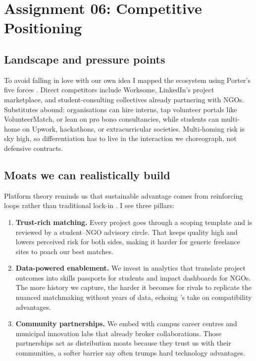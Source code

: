 \section*{Assignment 06: Competitive Positioning}

\subsection*{Landscape and pressure points}
To avoid falling in love with our own idea I mapped the ecosystem using Porter’s five forces \citep{Porter2008}. Direct competitors include Worksome, LinkedIn’s project marketplace, and student-consulting collectives already partnering with NGOs. Substitutes abound: organisations can hire interns, tap volunteer portals like VolunteerMatch, or lean on pro bono consultancies, while students can multi-home on Upwork, hackathons, or extracurricular societies. Multi-homing risk is sky high, so differentiation has to live in the interaction we choreograph, not defensive contracts.

\subsection*{Moats we can realistically build}
Platform theory reminds us that sustainable advantage comes from reinforcing loops rather than traditional lock-in \citep{Choudary2016,Reillier2017,Lecture07}. I see three pillars:
\begin{enumerate}
  \item \textbf{Trust-rich matching.} Every project goes through a scoping template and is reviewed by a student--NGO advisory circle. That keeps quality high and lowers perceived risk for both sides, making it harder for generic freelance sites to poach our best matches.
  \item \textbf{Data-powered enablement.} We invest in analytics that translate project outcomes into skills passports for students and impact dashboards for NGOs. The more history we capture, the harder it becomes for rivals to replicate the nuanced matchmaking without years of data, echoing \citet{FarrellSaloner1986}'s take on compatibility advantages.
  \item \textbf{Community partnerships.} We embed with campus career centres and municipal innovation labs that already broker collaborations. Those partnerships act as distribution moats because they trust us with their communities, a softer barrier \citet{ShapiroVarian1999} say often trumps hard technology advantages.
\end{enumerate}

